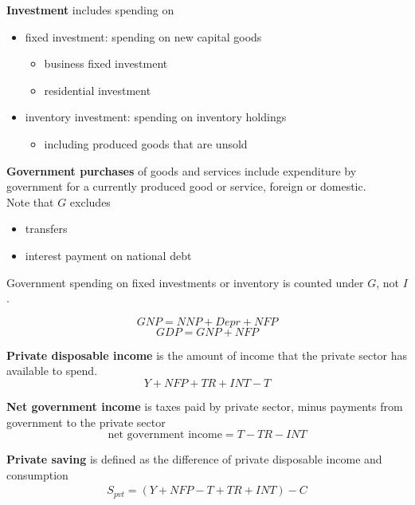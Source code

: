 \documentclass[letterpaper, 9pt,landscape]{extarticle}
\begin{document}
\begin{multicols*}{5}
\textbf{Investment} includes spending on
\begin{itemize}
    \item fixed investment: spending on new capital goods
    \begin{itemize}
        \item business fixed investment
        \item residential investment
    \end{itemize} 
    \item inventory investment: spending on inventory holdings
    \begin{itemize}
        \item including produced goods that are unsold
    \end{itemize} 
\end{itemize} 

\textbf{Government purchases} of goods and services include expenditure by government for a currently produced good or service, foreign or domestic. \\

Note that $G$ excludes
\begin{itemize}
    \item transfers 
    \item interest payment on national debt
\end{itemize} 

Government spending on fixed investments or inventory is counted under $G$, not $I$.

\begin{remark}
\[
    GNP = NNP + Depr + NFP
\]
\[
GDP = GNP + NFP
\]
\end{remark}

\begin{definition}
    \textbf{Private disposable income} is the amount of income that the private sector has available to spend.
    \[
       Y + NFP + TR + INT - T
    \]
\end{definition}

\begin{definition}
    \textbf{Net government income} is taxes paid by private sector, minus payments from government to the private sector 
    \[
        \text{net government income} = T - TR - INT
    \]
\end{definition}

\begin{definition}
    \textbf{Private saving} is defined as the difference of private disposable income and consumption 
    \begin{align*}
        S_{pvt} = (Y + NFP - T + TR + INT) - C
    \end{align*}
\end{definition}



\end{multicols*}
\end{document}
